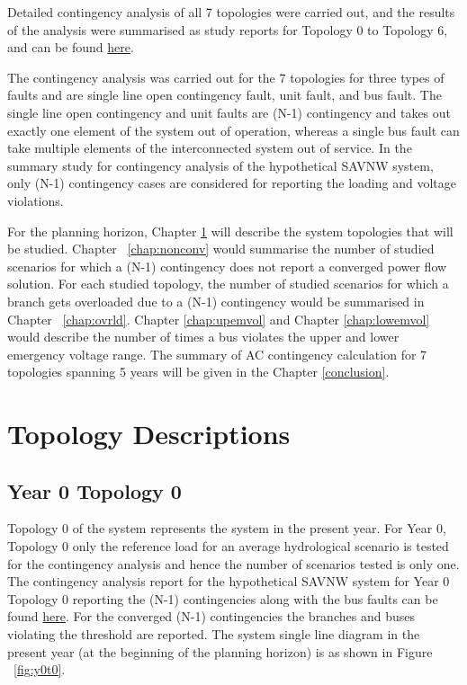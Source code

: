 \documentclass[10pt]{report}
\begin{document}
Detailed contingency analysis of all 7 topologies were carried out, and the results of the analysis were summarised as study reports for Topology 0 to Topology 6, and can be found \href{https://github.com/jessla89/PSSE-Contingency-Analysis}{here}. 

The contingency analysis was carried out for the 7 topologies for three types of faults and are single line open contingency fault, unit fault, and bus fault. The single line open contingency and unit faults are (N-1) contingency and takes out exactly one element of the system out of operation, whereas a single bus fault can take multiple elements of the interconnected system out of service. In the summary study for contingency analysis of the hypothetical SAVNW system, only (N-1) contingency cases are considered for reporting the loading and voltage violations. 

For the planning horizon, Chapter \ref{chap:sum} will describe the system topologies that will be studied. Chapter ~\ref{chap:nonconv} would summarise the number of studied scenarios for which a (N-1) contingency does not report a converged power flow solution. For each studied topology, the number of studied scenarios for which a branch gets overloaded due to a (N-1) contingency would be summarised in Chapter ~\ref{chap:ovrld}. Chapter \ref{chap:upemvol} and Chapter \ref{chap:lowemvol} would describe the number of times a bus violates the upper and lower emergency voltage range. The summary of AC contingency calculation for 7 topologies spanning 5 years will be given in the Chapter \ref{conclusion}. 




\chapter{Topology Descriptions}
\label{chap:sum}

\section{Year 0 Topology 0}
Topology 0 of the system represents the system in the present year. For Year 0, Topology 0 only the reference load for an average hydrological scenario is tested for the contingency analysis and hence the number of scenarios tested is only one. The contingency analysis report for the hypothetical SAVNW system for Year 0 Topology 0 reporting the (N-1) contingencies along with the bus faults can be found \href{https://github.com/jessla89/PSSE-Contingency-Analysis}{here}. For the converged (N-1) contingencies the branches and buses violating the threshold are reported. The system single line diagram in the present year (at the beginning of the planning horizon) is as shown in Figure ~\ref{fig:y0t0}.
\end{document}
